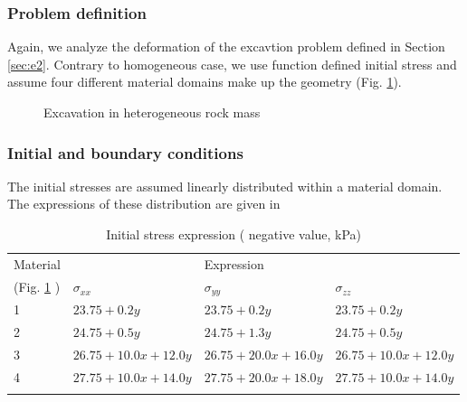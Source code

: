\subsubsection*{Problem definition}
Again, we analyze the deformation of the excavtion problem defined in Section \ref{sec:e2}. Contrary to homogeneous case,
  we  use function defined initial stress and assume four different material domains
 make up the geometry (Fig. \ref{fme:excav2}).
\begin{figure}[!thb]
  \begin{center}
  \end{center}
  \caption{Excavation in heterogeneous rock mass }
  \label{fme:excav2}
\end{figure}


\subsubsection*{Initial and boundary conditions}
The initial stresses are assumed linearly distributed within a material domain.
 The expressions of these distribution are given in
 \begin{table}[!htb]
\centering
\begin{tabular}{llll}
\hline\hline\noalign{\smallskip}
Material & & Expression &  \\
  (Fig.  \ref{fme:excav2} ) &$\sigma_{xx}$ &$\sigma_{yy}$ &$\sigma_{zz}$  \\
\noalign{\smallskip}\hline\noalign{\smallskip}
   1 & $23.75+0.2y       $ &  $   23.75+0.2y     $   &  $     23.75+0.2y    $  \\
   2  & $24.75+0.5y       $ &  $   24.75+1.3y     $   &  $     24.75+0.5y    $ \\
   3  & $26.75+10.0x+12.0y  $ &  $  26.75+20.0x+16.0y $   &  $    26.75+10.0x+12.0y$  \\
   4  & $27.75+10.0x+14.0y $ &  $  27.75+20.0x+18.0y$   &  $   27.75+10.0x+14.0y$  \\
\noalign{\smallskip}\hline
\end{tabular}
\caption{Initial stress expression ( negative value, kPa)}
\label{tab:initialStress}
\end{table}

